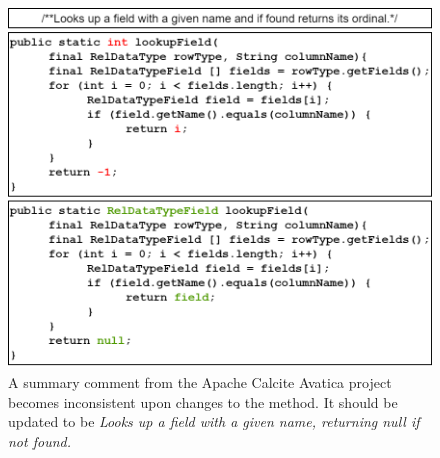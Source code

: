 \begin{figure}[t]
\centering
\includegraphics[scale=0.25]{images/summary_apache_calcite-avatica.png}
\vspace{-5pt}
\caption{A summary comment from the Apache Calcite Avatica project becomes inconsistent upon changes to the  method. It should be updated to be \textit{Looks up a field with a given name, returning null if not found.}}
\label{fig:apache-calcite-avatica}
\vspace{-10pt}
\end{figure}